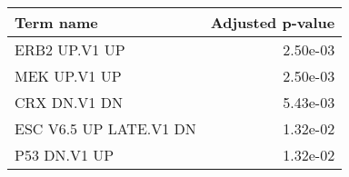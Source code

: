 \begin{tabular}{lr}
\toprule
             Term name &  Adjusted p-value \\
\midrule
         ERB2 UP.V1 UP &          2.50e-03 \\
          MEK UP.V1 UP &          2.50e-03 \\
          CRX DN.V1 DN &          5.43e-03 \\
ESC V6.5 UP LATE.V1 DN &          1.32e-02 \\
          P53 DN.V1 UP &          1.32e-02 \\
\bottomrule
\end{tabular}
